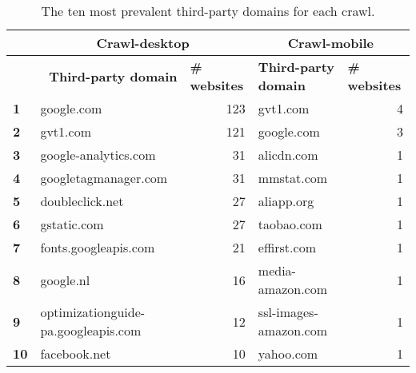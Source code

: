 \begin{table}[ht] 
\caption{The ten most prevalent third-party domains for each crawl.} 
\centering 
\begin{tabular}{|l|ll|ll|} 
\hline\textbf{} & \multicolumn{2}{c|}{\textbf{Crawl-desktop}} & \multicolumn{2}{c|}{\textbf{Crawl-mobile}} \\ \hline 
& \multicolumn{1}{r|}{\textbf{Third-party domain}} & \textbf{\# websites} & \multicolumn{1}{l|}{\textbf{Third-party domain}} & \textbf{\# websites} \\ \hline 
\textbf{1} & \multicolumn{1}{l|}{google.com} & \multicolumn{1}{r|}{123} & \multicolumn{1}{l|}{gvt1.com} & \multicolumn{1}{r|}{4} \\ \hline 
\textbf{2} & \multicolumn{1}{l|}{gvt1.com} & \multicolumn{1}{r|}{121} & \multicolumn{1}{l|}{google.com} & \multicolumn{1}{r|}{3} \\ \hline 
\textbf{3} & \multicolumn{1}{l|}{google-analytics.com} & \multicolumn{1}{r|}{31} & \multicolumn{1}{l|}{alicdn.com} & \multicolumn{1}{r|}{1} \\ \hline 
\textbf{4} & \multicolumn{1}{l|}{googletagmanager.com} & \multicolumn{1}{r|}{31} & \multicolumn{1}{l|}{mmstat.com} & \multicolumn{1}{r|}{1} \\ \hline 
\textbf{5} & \multicolumn{1}{l|}{doubleclick.net} & \multicolumn{1}{r|}{27} & \multicolumn{1}{l|}{aliapp.org} & \multicolumn{1}{r|}{1} \\ \hline 
\textbf{6} & \multicolumn{1}{l|}{gstatic.com} & \multicolumn{1}{r|}{27} & \multicolumn{1}{l|}{taobao.com} & \multicolumn{1}{r|}{1} \\ \hline 
\textbf{7} & \multicolumn{1}{l|}{fonts.googleapis.com} & \multicolumn{1}{r|}{21} & \multicolumn{1}{l|}{effirst.com} & \multicolumn{1}{r|}{1} \\ \hline 
\textbf{8} & \multicolumn{1}{l|}{google.nl} & \multicolumn{1}{r|}{16} & \multicolumn{1}{l|}{media-amazon.com} & \multicolumn{1}{r|}{1} \\ \hline 
\textbf{9} & \multicolumn{1}{l|}{optimizationguide-pa.googleapis.com} & \multicolumn{1}{r|}{12} & \multicolumn{1}{l|}{ssl-images-amazon.com} & \multicolumn{1}{r|}{1} \\ \hline 
\textbf{10} & \multicolumn{1}{l|}{facebook.net} & \multicolumn{1}{r|}{10} & \multicolumn{1}{l|}{yahoo.com} & \multicolumn{1}{r|}{1} \\ \hline 
\end{tabular} 
\label{tab:Top10} 
\end{table}